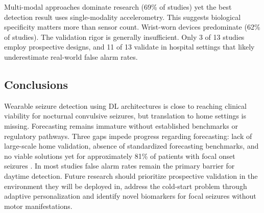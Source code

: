 Multi-modal approaches dominate research (69\% of studies) yet the best detection result uses single-modality accelerometry. This suggests biological specificity matters more than sensor count. Wrist-worn devices predominate (62\% of studies). The validation rigor is generally insufficient. Only 3 of 13 studies employ prospective designs, and 11 of 13 validate in hospital settings that likely underestimate real-world false alarm rates.

\subsection*{Conclusions}
Wearable seizure detection using DL architectures is close to reaching clinical viability for nocturnal convulsive seizures, but translation to home settings is missing. Forecasting remains immature without established benchmarks or regulatory pathways. Three gaps impede progress regarding forecasting: lack of large-scale home validation, absence of standardized forecasting benchmarks, and no viable solutions yet for approximately 81\% of patients with focal onset seizures \parencite{ayubNaturalHistoryGeneralized2020}. In most studies false alarm rates remain the primary barrier for daytime detection. Future research should prioritize prospective validation in the environment they will be deployed in, address the cold-start problem through adaptive personalization and identify novel biomarkers for focal seizures without motor manifestations.

